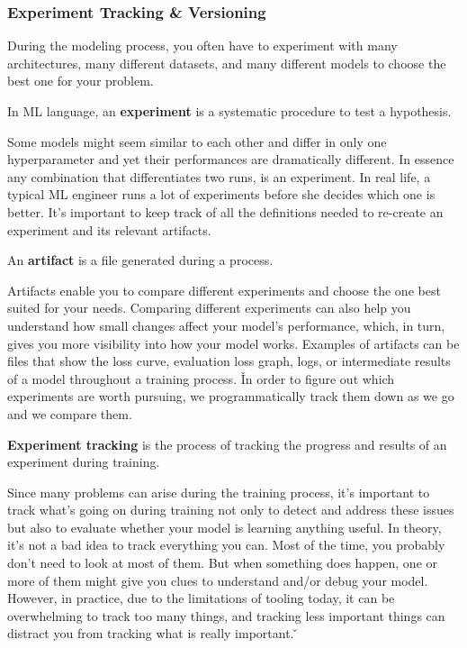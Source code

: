 
\subsubsection{Experiment Tracking \& Versioning}

During the modeling process, you often have to experiment with many architectures, many different datasets, and many
different models to choose the best one for your problem.

\bd[Experiment]
In ML language, an \textbf{experiment} is a systematic procedure to test a hypothesis.
\ed

Some models might seem similar to each other and differ in only one hyperparameter and yet their performances are
dramatically different. In essence any combination that differentiates two runs, is an experiment. In real life, a
typical ML engineer runs a lot of experiments before she decides which one is better. It's important to keep track of
all the definitions needed to re-create an experiment and its relevant artifacts.

\bd[Artifact]\label{def:artifact}
An \textbf{artifact} is a file generated during a process.
\ed

Artifacts enable you to compare different experiments and choose the one best suited for your needs. Comparing
different experiments can also help you understand how small changes affect your model's performance, which, in turn,
gives you more visibility into how your model works. Examples of artifacts can be files that show the loss curve,
evaluation loss graph, logs, or intermediate results of a model throughout a training process. \v

In order to figure out which experiments are worth pursuing, we programmatically track them down as we go and we compare
them.

\textbf{Experiment tracking} is the process of tracking the progress and results of an experiment during training.
\ed

Since many problems can arise during the training process, it's important to track what's going on during training
not only to detect and address these issues but also to evaluate whether your model is learning anything useful. In
theory, it's not a bad idea to track everything you can. Most of the time, you probably don't need to look at most of
them. But when something does happen, one or more of them might give you clues to understand and/or debug your model.
However, in practice, due to the limitations of tooling today, it can be overwhelming to track too many things, and
tracking less important things can distract you from tracking what is really important. \v

